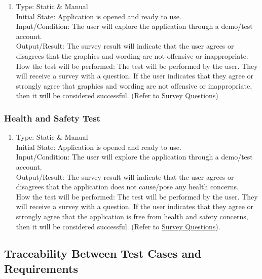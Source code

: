 \documentclass[12pt, titlepage]{article}
\begin{document}
\begin{adjustwidth}{2.2em}{0pt}
\begin{enumerate}[{NF-CT}1.]
    \item Type: Static \& Manual\\ \label{CT1}
    Initial State: Application is opened and ready to use.\\
    Input/Condition: The user will explore the application through a demo/test account. \\
    Output/Result: The survey result will indicate that the user agrees or disagrees that the graphics and wording are not offensive or inappropriate.\\
    How the test will be performed: The test will be performed by the user. They will receive a survey with a question. If the user indicates that they agree or strongly agree that graphics and wording are not offensive or inappropriate, then it will be considered successful. (Refer to \hyperref[SQ]{Survey Questions})
\end{enumerate}
\end{adjustwidth}

\subsubsection{Health and Safety Test}

\begin{adjustwidth}{2.2em}{0pt}
\begin{enumerate}[{NF-HT}1.] 
    \item Type: Static \& Manual\\ \label{HT1}
    Initial State: Application is opened and ready to use.\\
    Input/Condition: The user will explore the application through a demo/test account. \\
    Output/Result: The survey result will indicate that the user agrees or disagrees that the application does not cause/pose any health concerns.\\
    How the test will be performed: The test will be performed by the user. They will receive a survey with a question. If the user indicates that they agree or strongly agree that the application is free from health and safety concerns, then it will be considered successful. (Refer to \hyperref[SQ]{Survey Questions}).  
\end{enumerate}
\end{adjustwidth}

\newpage
\subsection{Traceability Between Test Cases and Requirements}
\end{document}
